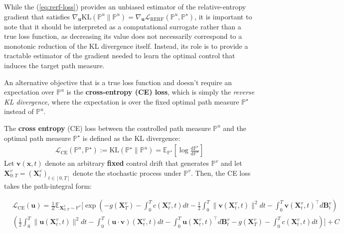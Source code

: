\documentclass{article}
\newcommand{\boldtext}[1]{\textbf{\textcolor{MyGreen}{#1}}}
\begin{document}
While the (\ref{eq:rerf-loss}) provides an unbiased estimator of the relative-entropy gradient that satisfies $\nabla_{\boldsymbol{u}}\text{KL}(\mathbb{P}^u\|\mathbb{P}^u)=\nabla_{\boldsymbol{u}}\mathcal{L}_{\text{RERF}}(\mathbb{P}^u, \mathbb{P}^\star)$, it is important to note that it should be interpreted as a computational surrogate rather than a true loss function, as decreasing its value does not necessarily correspond to a monotonic reduction of the KL divergence itself. Instead, its role is to provide a tractable estimator of the gradient needed to learn the optimal control that induces the target path measure.

An alternative objective that is a true loss function and doesn't require an expectation over $\mathbb{P}^u$ is the \boldtext{cross-entropy (CE) loss}, which is simply the \textit{reverse KL divergence}, where the expectation is over the fixed optimal path measure $\mathbb{P}^\star$ instead of $\mathbb{P}^u$.

\begin{definition}\label{def:cross-entropy}
    The \textbf{cross entropy} (CE) loss between the controlled path measure $\mathbb{P}^u$ and the optimal path measure $\mathbb{P}^\star$ is defined as the KL divergence:
    \begin{align}
        \mathcal{L}_{\text{CE}}(\mathbb{P}^u, \mathbb{P}^\star):=\text{KL}(\mathbb{P}^\star\|\mathbb{P}^u)=\mathbb{E}_{\mathbb{P}^\star}\left[\log \frac{\mathrm{d}\mathbb{P}^\star}{\mathrm{d}\mathbb{P}^u}\right]\tag{Cross Entropy Objective}\label{eq:cross-entropy-path}
    \end{align}
    Let $\boldsymbol{v}(\boldsymbol{x},t)$ denote an arbitrary \textbf{fixed} control drift that generates $\mathbb{P}^v$ and let $\boldsymbol{X}^v_{0:T}=(\boldsymbol{X}^v_t)_{t\in [0,T]}$ denote the stochastic process under $\mathbb{P}^v$. Then, the CE loss takes the path-integral form:
    \begin{small}
    \begin{align}
        &\mathcal{L}_{\text{CE}}(\boldsymbol{u})=\frac{1}{Z}\mathbb{E}_{\boldsymbol{X}_{0:T}^v\sim\mathbb{P}^v}\bigg[\exp\left(-g(\boldsymbol{X}^v_T)-\int_0^Tc(\boldsymbol{X}^v_t,t)dt-\frac{1}{2}\int_0^T\|\boldsymbol{v}(\boldsymbol{X}^v_t,t)\|^2dt-\int_0^T\boldsymbol{v}(\boldsymbol{X}^v_t,t)^\top d\boldsymbol{B}^v_t\right)\nonumber\\
        &\left(\frac{1}{2}\int_0^T\|\boldsymbol{u}(\boldsymbol{X}^v_t,t)\|^2dt-\int_0^T(\boldsymbol{u}\cdot \boldsymbol{v})(\boldsymbol{X}^v_t,t)dt-\int_0^T\boldsymbol{u}(\boldsymbol{X}^v_t,t)^\top d\boldsymbol{B}^v_t-g(\boldsymbol{X}^v_T)-\int_0^Tc(\boldsymbol{X}^v_t,t)dt\right)\bigg]+C\tag{CE Loss}\label{eq:soc-cross-entropy}
    \end{align}
    \end{small}
\end{definition}
\end{document}
